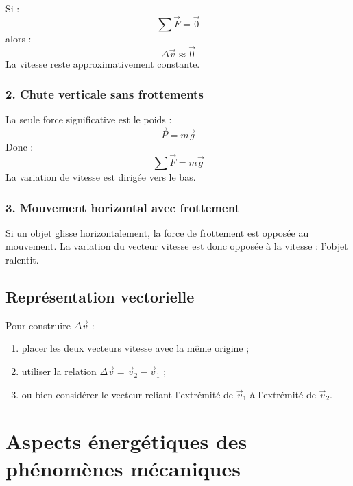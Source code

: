 \documentclass[11pt,a4paper]{article}
\begin{document}
Si :
\[
\sum \vec{F}=\vec{0}
\]
alors :
\[
\Delta \vec{v}\approx \vec{0}
\]
La vitesse reste approximativement constante.

\subsubsection*{2. Chute verticale sans frottements}

La seule force significative est le poids :
\[
\vec{P}=m\vec{g}
\]
Donc :
\[
\sum \vec{F}=m\vec{g}
\]
La variation de vitesse est dirigée vers le bas.

\subsubsection*{3. Mouvement horizontal avec frottement}

Si un objet glisse horizontalement, la force de frottement est opposée au mouvement.  
La variation du vecteur vitesse est donc opposée à la vitesse : l'objet ralentit.

\subsection{Représentation vectorielle}

\begin{center}
\end{center}

\begin{methodebox}
Pour construire $\Delta \vec{v}$ :
\begin{enumerate}
    \item placer les deux vecteurs vitesse avec la même origine ;
    \item utiliser la relation $\Delta\vec{v}=\vec{v}_2-\vec{v}_1$ ;
    \item ou bien considérer le vecteur reliant l'extrémité de $\vec{v}_1$ à l'extrémité de $\vec{v}_2$.
\end{enumerate}
\end{methodebox}

\section{Aspects énergétiques des phénomènes mécaniques}
\end{document}
